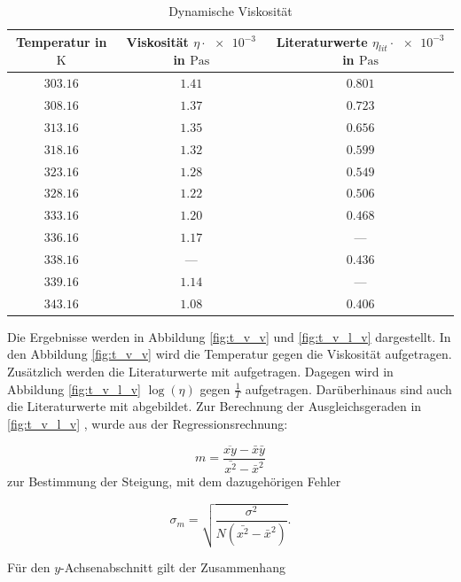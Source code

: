 \begin{table}
\centering
\begin{tabular} {ccc}
  \toprule
  Temperatur in $\si{\kelvin}$ & Viskosität $\eta\cdot\num{e-3}$ in $\si{\pascal\second}$ & Literaturwerte $\eta_{lit}\cdot\num{e-3}$ in $\si{\pascal\second}$  \\
  \midrule
  $\num{303.16}$ & $\num{1.41}$ & $\num{0.801}$  \\
  $\num{308.16}$ & $\num{1.37}$ & $\num{0.723}$  \\
  $\num{313.16}$ & $\num{1.35}$& $\num{0.656}$  \\
  $\num{318.16}$ & $\num{1.32}$ & $\num{0.599}$\\
  $\num{323.16}$ & $\num{1.28}$& $\num{0.549}$ \\
  $\num{328.16}$ & $\num{1.22}$& $\num{0.506}$ \\
  $\num{333.16}$ & $\num{1.20}$& $\num{0.468}$ \\
  $\num{336.16}$ & $\num{1.17}$&  --- \\
  $\num{338.16}$ & --- & $\num{0.436}$ \\
  $\num{339.16}$ & $\num{1.14}$&  --- \\
  $\num{343.16}$ & $\num{1.08}$& $\num{0.406}$ \\
\bottomrule
\end{tabular}
\caption{Dynamische Viskosität} %
\label{tab:visko_wasser_temp}
\end{table}

Die Ergebnisse werden in Abbildung \ref{fig:t_v_v} und \ref{fig:t_v_l_v} dargestellt.
In den Abbildung \ref{fig:t_v_v} wird die Temperatur gegen die Viskosität aufgetragen.
Zusätzlich werden die Literaturwerte \cite{lit_dichte} mit aufgetragen.
Dagegen wird in Abbildung \ref{fig:t_v_l_v} $\log(\eta)$ gegen $\frac{1}{T}$ aufgetragen.
Darüberhinaus sind auch die Literaturwerte \cite{lit_dichte} mit abgebildet.
Zur Berechnung der Ausgleichsgeraden in \ref{fig:t_v_l_v} , wurde aus der Regressionsrechnung:

\begin{equation*}
m=\frac{\overline{xy}-\bar{x}\bar{y}}{\bar{x^2}-\bar{x}^2}
\end{equation*}
zur Bestimmung der Steigung, mit dem dazugehörigen Fehler

\begin{equation*}
\sigma_m=\sqrt{\frac{\sigma^2}{N(\bar{x^2}-\bar{x}^2)}}.
\end{equation*}

Für den $y$-Achsenabschnitt gilt der Zusammenhang

